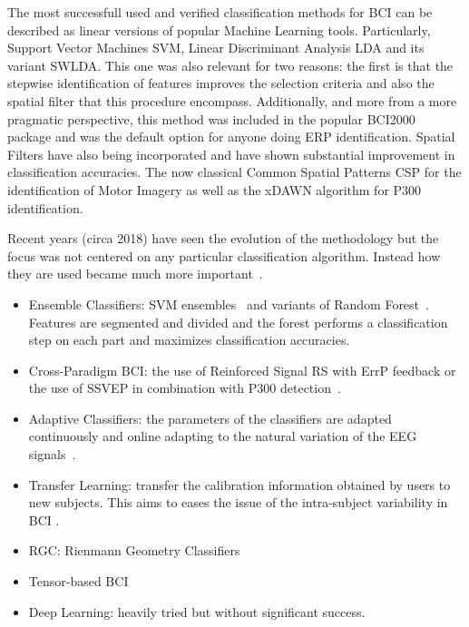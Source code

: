 The most successfull used and verified classification methods for BCI \cite{Lotte2007} can be described as linear versions of popular Machine Learning tools.  Particularly, Support Vector Machines SVM, Linear Discriminant Analysis LDA and its variant SWLDA.  This one was also relevant for two reasons:  the first is that the stepwise identification of features improves the selection criteria and also the spatial filter that this procedure encompass.  Additionally, and more from a more pragmatic perspective, this method was included in the popular BCI2000~\cite{bci2000} package and was the default option for anyone doing ERP identification.  Spatial Filters have also being incorporated and have shown substantial improvement in classification accuracies.  The now classical Common Spatial Patterns CSP for the identification of Motor Imagery as well as the xDAWN algorithm for P300 identification.

Recent years (circa 2018) have seen the evolution of the methodology but the focus was not centered on any particular classification algorithm.  Instead how they are used became much more important~\cite{Lotte2018}.

\begin{itemize}
\item Ensemble Classifiers: SVM ensembles~\cite{Rakotomamonjy2008} and variants of Random Forest~\cite{Steryl2014}.  Features are segmented and divided and the forest performs a classification step on each part and maximizes classification accuracies.
\item Cross-Paradigm BCI: the use of Reinforced Signal RS with ErrP feedback or the use of SSVEP in combination with P300 detection~\cite{aca}.
\item Adaptive Classifiers: the parameters of the classifiers are adapted continuously and online adapting to the natural variation of the EEG signals~\cite{Lotte2018}.
\item Transfer Learning: transfer the calibration information obtained by users to new subjects.  This aims to eases the issue of the intra-subject variability in BCI .
\item RGC: Rienmann Geometry Classifiers
\item Tensor-based BCI
\item Deep Learning: heavily tried but without significant success.
\end{itemize}


